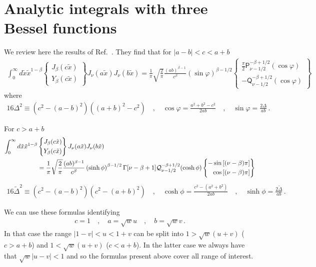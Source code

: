 \documentclass[aps,10pt,prd,groupedaddress,nofootinbib,notitlepage,eqsecnum,preprintnumbers]{revtex4-1}
\begin{document}
\section{Analytic integrals with three Bessel functions \label{App:integralbessel}}
We review here the results of Ref.~\cite{threebesselI}. They find that for $|a-b|<c<a+b$
\begin{align}
\int_0^{\infty} d\tilde x \tilde x^{1-\beta}
\left\{	
\begin{aligned}
	J_\beta(c\tilde x)\\
	Y_\beta(c\tilde x)
\end{aligned}
\right\}
J_{\nu}(a\tilde x)J_{\nu}(b\tilde x)=\frac{1}{\pi}\sqrt{\frac{2}{\pi}}\frac{(ab)^{\beta-1}}{c^\beta}\left(\sin\varphi\right)^{\beta-1/2}\left\{	
\begin{aligned}
	\frac{\pi}{2}\mathsf{P}^{-\beta+1/2}_{\nu-1/2}(\cos\varphi)\\
	-\mathsf{Q}^{-\beta+1/2}_{\nu-1/2}(\cos\varphi)
\end{aligned}
\right\}
\end{align}
where
\begin{align}
16\Delta^2\equiv\left(c^2-(a-b)^2\right)\left((a+b)^2-c^2\right)\quad,\quad
\cos\varphi=\frac{a^2+b^2-c^2}{2ab}\quad,\quad\sin\varphi=\frac{2\Delta}{ab}\,.
\end{align}

For $c>a+b$
\begin{align}
\int_0^{\infty} d\tilde x \tilde x^{1-\beta}
&\left\{	
\begin{aligned}
	J_\beta(c\tilde x)\\
	Y_\beta(c\tilde x)
\end{aligned}
\right\}
J_{\nu}(a\tilde x)J_{\nu}(b\tilde x)\nonumber\\&
=\frac{1}{\pi}\sqrt{\frac{2}{\pi}}\frac{(ab)^{\beta-1}}{c^\beta}\left(\sinh\phi\right)^{\beta-1/2}\Gamma[\nu-\beta+1]{\cal Q}^{-\beta+1/2}_{\nu-1/2}(\cosh\phi)\left\{	
\begin{aligned}
	-\sin\left[(\nu-\beta)\pi\right]\\
	\cos\left[(\nu-\beta)\pi\right]
\end{aligned}
\right\}
\end{align}
\begin{align}
16\tilde\Delta^2\equiv\left(c^2-(a-b)^2\right)\left(c^2-(a+b)^2\right) \quad {,}\quad 
\cosh\phi=\frac{c^2-(a^2+b^2)}{2ab}\quad,\quad\sinh\phi=\frac{2\tilde\Delta}{ab}\,.
\end{align}

We can use these formulas identifying
\begin{align*}
c=1\quad,\quad a=\sqrt{w}u\quad,\quad b=\sqrt{w}v\,.
\end{align*}
In that case the range $|1-v|<u<1+v$ can be split into $1>\sqrt{w}(u+v)$ ($c>a+b$) and $1<\sqrt{w}(u+v)$ ($c<a+b$). In the latter case we always have that $\sqrt{w}|u-v|<1$ and so the formulas present above cover all range of interest. 
\end{document}

